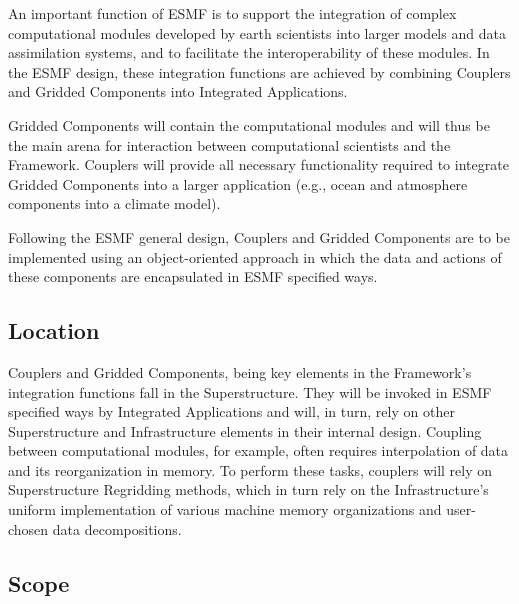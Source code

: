 




An important function of ESMF is to support the integration of
complex computational modules developed by earth scientists into
larger models and data assimilation systems, and to facilitate
the interoperability of these modules. 
In the ESMF design, these integration functions 
are achieved by combining Couplers
and Gridded Components into Integrated Applications.

Gridded Components will contain the 
computational modules and will thus be the main arena for interaction
between computational scientists and the Framework.  Couplers will
provide all necessary functionality required to integrate Gridded Components
into a larger application (e.g., ocean and atmosphere components into
a climate model).

Following the ESMF general design, Couplers and Gridded Components
are to be implemented using an object-oriented approach  
in which the data and actions of these components are encapsulated in 
ESMF specified ways.

\subsection{Location}

Couplers and Gridded Components, being key elements in the
Framework's integration functions fall in the Superstructure.
They will be invoked in ESMF specified ways by Integrated Applications 
and will, in turn, rely on other Superstructure and Infrastructure
elements in their internal design.  Coupling between computational
modules, for example, often requires interpolation of data and
its reorganization in memory. To perform these tasks, couplers will
rely on Superstructure Regridding methods, which in turn rely on the 
Infrastructure's uniform  implementation of various machine memory
organizations and user-chosen data decompositions.




\subsection{Scope}




